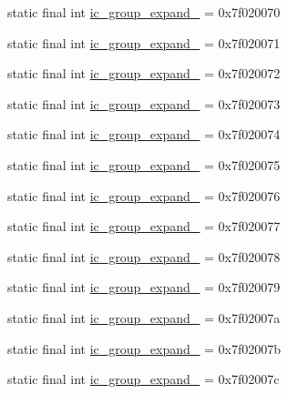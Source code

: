 \begin{CompactItemize}
static final int \hyperlink{classandroid_1_1support_1_1v7_1_1cardview_1_1_r_1_1drawable_98acced9856d3d9ad2bd2185ddf2fb54}{ic\_\-group\_\-expand\_} = 0x7f020070
\item 
static final int \hyperlink{classandroid_1_1support_1_1v7_1_1cardview_1_1_r_1_1drawable_94df7a206c63d413fb9150eb12b0fba7}{ic\_\-group\_\-expand\_} = 0x7f020071
\item 
static final int \hyperlink{classandroid_1_1support_1_1v7_1_1cardview_1_1_r_1_1drawable_cd55ba87f65a4879054dd51d684fb247}{ic\_\-group\_\-expand\_} = 0x7f020072
\item 
static final int \hyperlink{classandroid_1_1support_1_1v7_1_1cardview_1_1_r_1_1drawable_e9cc3fe67752818b4eed9b2f08922927}{ic\_\-group\_\-expand\_} = 0x7f020073
\item 
static final int \hyperlink{classandroid_1_1support_1_1v7_1_1cardview_1_1_r_1_1drawable_3a8b6edae122395fb9691c9477cfd31b}{ic\_\-group\_\-expand\_} = 0x7f020074
\item 
static final int \hyperlink{classandroid_1_1support_1_1v7_1_1cardview_1_1_r_1_1drawable_8111b5f38ef4ef0336c4c3d578a9483f}{ic\_\-group\_\-expand\_} = 0x7f020075
\item 
static final int \hyperlink{classandroid_1_1support_1_1v7_1_1cardview_1_1_r_1_1drawable_5944bc6accfb45b353a0ee1ed28aa757}{ic\_\-group\_\-expand\_} = 0x7f020076
\item 
static final int \hyperlink{classandroid_1_1support_1_1v7_1_1cardview_1_1_r_1_1drawable_d3dedf9fac4d685be9d16bab82e2c122}{ic\_\-group\_\-expand\_} = 0x7f020077
\item 
static final int \hyperlink{classandroid_1_1support_1_1v7_1_1cardview_1_1_r_1_1drawable_d5bf83352139456e024c640e463e860e}{ic\_\-group\_\-expand\_} = 0x7f020078
\item 
static final int \hyperlink{classandroid_1_1support_1_1v7_1_1cardview_1_1_r_1_1drawable_3c34d6293d4116bd1e6eba78691dfa09}{ic\_\-group\_\-expand\_} = 0x7f020079
\item 
static final int \hyperlink{classandroid_1_1support_1_1v7_1_1cardview_1_1_r_1_1drawable_1c23ca693a0bee04c0b67e9125e857b9}{ic\_\-group\_\-expand\_} = 0x7f02007a
\item 
static final int \hyperlink{classandroid_1_1support_1_1v7_1_1cardview_1_1_r_1_1drawable_82b716fb63587c0de2aa32b694f9c044}{ic\_\-group\_\-expand\_} = 0x7f02007b
\item 
static final int \hyperlink{classandroid_1_1support_1_1v7_1_1cardview_1_1_r_1_1drawable_b2a14980c1c5547b817ab3d0ccc77c87}{ic\_\-group\_\-expand\_} = 0x7f02007c

\end{CompactItemize}
